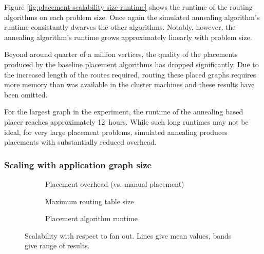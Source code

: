 				Figure \ref{fig:placement-scalability-size-runtime} shows the runtime
				of the routing algorithms on each problem size. Once again the
				simulated annealing algorithm's runtime consistantly dwarves the other
				algorithms. Notably, however, the annealing algorithm's runtime grows
				approximately linearly with problem size.
				
				Beyond around quarter of a million vertices, the quality of the
				placements produced by the baseline placement algorithms has dropped
				significantly. Due to the increased length of the routes required,
				routing these placed graphs requires more memory than was available in
				the cluster machines and these results have been omitted.
				
				For the largest graph in the experiment, the runtime of the annealing
				based placer reaches approximately 12~hours. While such long runtimes
				may not be ideal, for very large placement problems, simulated
				annealing produces placements with substantially reduced overhead.
			
			
			\subsubsection{Scaling with application graph size}
			
				\begin{figure}
					\center
					\begin{subfigure}{\linewidth}
						\center
						
						\caption{Placement overhead (vs. manual placement)}
						\label{fig:placement-scalability-fanout-quality}
					\end{subfigure}
					
					\vspace*{1em}
					
					\begin{subfigure}{\linewidth}
						\center
						
						\caption{Maximum routing table size}
						\label{fig:placement-scalability-fanout-entries}
					\end{subfigure}
					
					\vspace*{1em}
					
					\begin{subfigure}{\linewidth}
						\center
						
						\caption{Placement algorithm runtime}
						\label{fig:placement-scalability-fanout-runtime}
					\end{subfigure}
					
						\caption{Scalability with respect to fan out. Lines give mean values,
						bands give range of results.}
					\label{fig:placement-scalability-fanout}
				\end{figure}
				
